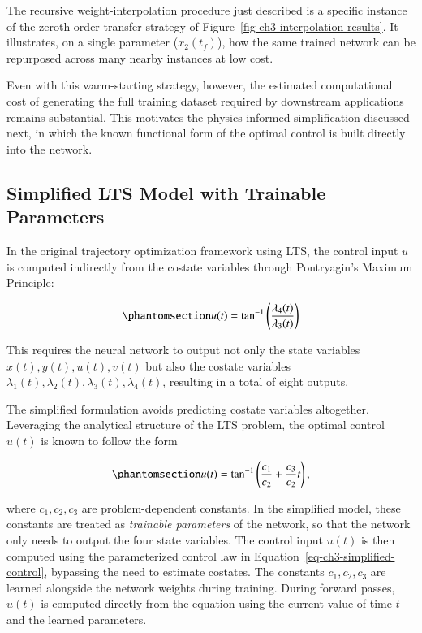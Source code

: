 \documentclass[
  number,
  preprint]{elsarticle}
\begin{document}
The recursive weight-interpolation procedure just described is a
specific instance of the zeroth-order transfer strategy of
Figure~\ref{fig-ch3-interpolation-results}. It illustrates, on a single
parameter (\(x_2(t_f)\)), how the same trained network can be repurposed
across many nearby instances at low cost.

Even with this warm-starting strategy, however, the estimated
computational cost of generating the full training dataset required by
downstream applications remains substantial. This motivates the
physics-informed simplification discussed next, in which the known
functional form of the optimal control is built directly into the
network.

\subsection{Simplified LTS Model with Trainable
Parameters}\label{simplified-lts-model-with-trainable-parameters}

In the original trajectory optimization framework using LTS, the control
input \(u\) is computed indirectly from the costate variables through
Pontryagin's Maximum Principle:

\begin{equation}\protect\phantomsection\label{eq-ch3-original-control}{
u(t) = \tan^{-1}\left(\frac{\lambda_4(t)}{\lambda_3(t)}\right)
}\end{equation}

This requires the neural network to output not only the state variables
\(x(t), y(t), u(t), v(t)\) but also the costate variables
\(\lambda_1(t), \lambda_2(t), \lambda_3(t), \lambda_4(t)\), resulting in
a total of eight outputs.

The simplified formulation avoids predicting costate variables
altogether. Leveraging the analytical structure of the LTS problem, the
optimal control \(u(t)\) is known to follow the form

\begin{equation}\protect\phantomsection\label{eq-ch3-simplified-control}{
u(t) = \tan^{-1} \left( \frac{c_1}{c_2} + \frac{c_3}{c_2} t \right),
}\end{equation}

where \(c_1, c_2, c_3\) are problem-dependent constants. In the
simplified model, these constants are treated as \emph{trainable
parameters} of the network, so that the network only needs to output the
four state variables. The control input \(u(t)\) is then computed using
the parameterized control law in
Equation~\ref{eq-ch3-simplified-control}, bypassing the need to estimate
costates. The constants \(c_1, c_2, c_3\) are learned alongside the
network weights during training. During forward passes, \(u(t)\) is
computed directly from the equation using the current value of time
\(t\) and the learned parameters.
\end{document}
